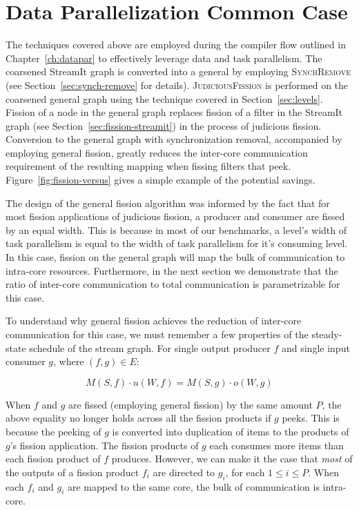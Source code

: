 \section{Data Parallelization Common Case}

The techniques covered above are employed during the compiler flow
outlined in Chapter~\ref{ch:datapar} to effectively leverage data and
task parallelism.  The coarsened StreamIt graph is converted into a
general by employing \textsc{SynchRemove} (see
Section~\ref{sec:synch-remove} for details).  \textsc{JudiciousFission} is
performed on the coarsened general graph using the technique covered
in Section~\ref{sec:levels}.  Fission of a node in the general graph
replaces fission of a filter in the StreamIt graph (see
Section~\ref{sec:fission-streamit}) in the process of judicious
fission.  Conversion to the general graph with synchronization
removal, accompanied by employing general fission, greatly reduces the
inter-core communication requirement of the resulting mapping when
fissing filters that peek.  Figure~\ref{fig:fission-versus} gives a
simple example of the potential savings.

The design of the general fission algorithm was informed by the fact
that for most fission applications of judicious fission, a producer
and consumer are fissed by an equal width.  This is because in most of
our benchmarks, a level's width of task parallelism is equal to the
width of task parallelism for it's consuming level.  In this case,
fission on the general graph will map the bulk of communication to
intra-core resources.  Furthermore, in the next section we demonstrate
that the ratio of inter-core communication to total communication is
parametrizable for this case.

To understand why general fission achieves the reduction of inter-core
communication for this case, we must remember a few properties of the
steady-state schedule of the stream graph.  For single output producer
$f$ and single input consumer $g$, where $(f,g) \in E$:

\[ M(S, f) \cdot u(W, f) = M(S,g) \cdot o(W,g) \]

\noindent When $f$ and $g$ are fissed (employing general fission) by
the same amount $P$, the above equality no longer holds across all the
fission products if $g$ peeks.  This is because the peeking of $g$ is
converted into duplication of items to the products of $g$'s fission
application.  The fission products of $g$ each consumes more items
than each fission product of $f$ produces.  However, we can make it
the case that {\it most} of the outputs of a fission product $f_i$ are
directed to $g_i$, for each $1 \le i \le P$.  When each $f_i$ and
$g_i$ are mapped to the same core, the bulk of communication is
intra-core.

